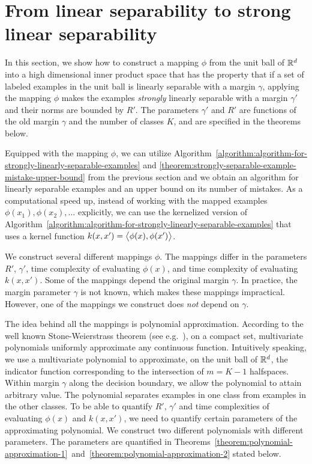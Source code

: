 \section{From linear separability to strong linear separability}
\label{section:from-linear-separability-to-strong-linear-separability}

In this section, we show how to construct a mapping $\phi$ from the unit ball of
$\mathbb{R}^d$ into a high dimensional inner product space that has the property that if
a set of labeled examples in the unit ball is linearly separable with a margin
$\gamma$, applying the mapping $\phi$ makes the examples \emph{strongly}
linearly separable with a margin $\gamma'$ and their norms are bounded by $R'$.
The parameters $\gamma'$ and $R'$ are functions of the old margin $\gamma$ and
the number of classes $K$, and are specified in the theorems below.

Equipped with the mapping $\phi$, we can utilize
Algorithm~\ref{algorithm:algorithm-for-strongly-linearly-separable-examples} and
\autoref{theorem:strongly-separable-example-mistake-upper-bound} from the
previous section and we obtain an algorithm for linearly separable examples and
an upper bound on its number of mistakes. As a computational speed up, instead
of working with the mapped examples $\phi(x_1), \phi(x_2), \dots$ explicitly, we
can use the kernelized version of
Algorithm~\ref{algorithm:algorithm-for-strongly-linearly-separable-examples}
that uses a kernel function $k(x,x') = \left\langle \phi(x), \phi(x') \right\rangle$.

We construct several different mappings $\phi$. The mappings differ in the
parameters $R'$, $\gamma'$, time complexity of evaluating $\phi(x)$, and time
complexity of evaluating $k(x,x')$. Some of the mappings depend the original
margin $\gamma$. In practice, the margin parameter $\gamma$ is not known, which
makes these mappings impractical. However, one of the mappings we construct
does \emph{not} depend on $\gamma$.

The idea behind all the mappings is polynomial approximation. According to the
well known Stone-Weierstrass theorem (see
e.g.~\citep[Section~10.10]{Davidson-Donsig-2010}), on a compact set,
multivariate polynomials uniformly approximate any continuous function.
Intuitively speaking, we use a multivariate polynomial to approximate, on the
unit ball of $\mathbb{R}^d$, the indicator function corresponding to the intersection of
$m=K-1$ halfspaces. Within margin $\gamma$ along the decision boundary, we allow
the polynomial to attain arbitrary value. The polynomial separates examples in
one class from examples in the other classes. To be able to quantify $R'$,
$\gamma'$ and time complexities of evaluating $\phi(x)$ and $k(x,x')$, we need
to quantify certain parameters of the approximating polynomial. We construct two
different polynomials with different parameters. The parameters are quantified
in
Theorems~\ref{theorem:polynomial-approximation-1}~and~\ref{theorem:polynomial-approximation-2}
stated below.

